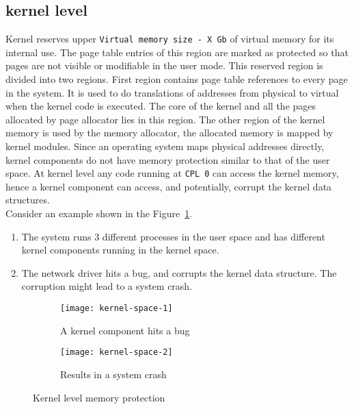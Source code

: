 \subsection{kernel level}
\label{subsec:kernel level}
Kernel reserves upper \texttt{Virtual memory size - X Gb} of virtual memory for its internal use. The page table entries of this region are marked as protected so that pages are not visible or modifiable in the user mode. This reserved region is divided into two regions. First region contains page table references to every page in the system. It is used to do translations of addresses from physical to virtual when the kernel code is executed. The core of the kernel and all the pages allocated by page allocator lies in this region. The other region of the kernel memory is used by the memory allocator, the allocated memory is mapped by kernel modules. Since an operating system maps physical addresses directly, kernel components do not have memory protection similar to that of the user space. At kernel level any code running at \texttt{CPL 0} can access the kernel memory, hence a kernel component can access, and potentially, corrupt the kernel data structures. 
\\[3mm]
Consider an example shown in the Figure~\ref{fig:Kernel space}.
\begin{enumerate}
\item The system runs 3 different processes in the user space and has different kernel components running in the kernel space.
\item The network driver hits a bug, and corrupts the kernel data structure. The corruption might lead to a system crash.
\end{enumerate}
\begin{figure}[!ht]
    \centering
    \begin{subfigure}[b]{0.49\textwidth}
	\texttt{[image: kernel-space-1]}
	\caption{A kernel component hits a bug}
    \end{subfigure}
	\hfill
    \begin{subfigure}[b]{0.49\textwidth}
	\texttt{[image: kernel-space-2]}
	\caption{Results in a system crash}
    \end{subfigure}
    \caption{Kernel level memory protection}\label{fig:Kernel space}
\end{figure}


